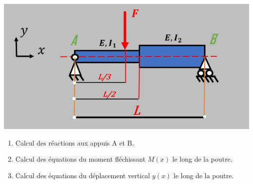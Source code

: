 \documentclass[lecture.tex]{subfiles}
\begin{document}
\exercice{}

\begin{center}
  \includegraphics[scale=0.5]{figA0033.png}
\end{center}

\begin{enumerate}
    \item Calcul des réactions aux appuis A et B.
    \item Calcul des équations du moment fléchissant $M(x)$ le long de la poutre.
    \item Calcul des équations du déplacement vertical $y(x)$ le long de la poutre.
\end{enumerate}

\finexercice
\end{document}
